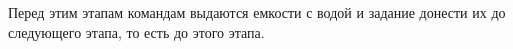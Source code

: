 \par Перед этим этапам командам выдаются емкости с водой и задание донести их до следующего этапа, то есть до этого этапа.